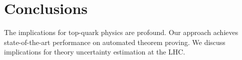 \section{Conclusions}\label{sec:conclusions}

The implications for top-quark physics are profound. Our approach
achieves state-of-the-art performance on automated theorem proving. We
discuss implications for theory uncertainty estimation at the LHC.

